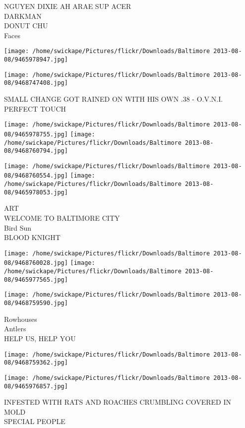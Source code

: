 \documentclass[10pt,letterpaper]{article}
\begin{document}
NGUYEN DIXIE AH ARAE SUP ACER\\
DARKMAN\\
DONUT CHU\\
Faces
\pagebreak

\texttt{[image: /home/swickape/Pictures/flickr/Downloads/Baltimore 2013-08-08/9465978947.jpg]}

\vspace{0.25in}
\texttt{[image: /home/swickape/Pictures/flickr/Downloads/Baltimore 2013-08-08/9468747408.jpg]}

SMALL CHANGE GOT RAINED ON WITH HIS OWN .38 {-} O.V.N.I.\\
PERFECT TOUCH
\pagebreak

\texttt{[image: /home/swickape/Pictures/flickr/Downloads/Baltimore 2013-08-08/9465978755.jpg]}
\texttt{[image: /home/swickape/Pictures/flickr/Downloads/Baltimore 2013-08-08/9468760794.jpg]}

\texttt{[image: /home/swickape/Pictures/flickr/Downloads/Baltimore 2013-08-08/9468760554.jpg]}
\texttt{[image: /home/swickape/Pictures/flickr/Downloads/Baltimore 2013-08-08/9465978053.jpg]}

ART\\
WELCOME TO BALTIMORE CITY\\
Bird Sun\\
BLOOD KNIGHT
\pagebreak

\texttt{[image: /home/swickape/Pictures/flickr/Downloads/Baltimore 2013-08-08/9468760028.jpg]}
\texttt{[image: /home/swickape/Pictures/flickr/Downloads/Baltimore 2013-08-08/9465977565.jpg]}

\vspace{0.25in}
\texttt{[image: /home/swickape/Pictures/flickr/Downloads/Baltimore 2013-08-08/9468759590.jpg]}

Rowhouses\\
Antlers\\
HELP US, HELP YOU
\pagebreak

\texttt{[image: /home/swickape/Pictures/flickr/Downloads/Baltimore 2013-08-08/9468759362.jpg]}

\vspace{0.25in}
\texttt{[image: /home/swickape/Pictures/flickr/Downloads/Baltimore 2013-08-08/9465976857.jpg]}

INFESTED WITH RATS AND ROACHES CRUMBLING COVERED IN MOLD\\
SPECIAL PEOPLE
\pagebreak
\end{document}
